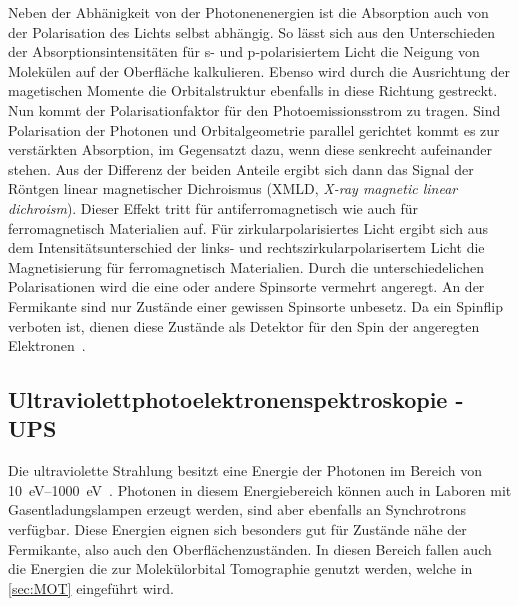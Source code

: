             Neben der Abhänigkeit von der Photonenenergien ist die Absorption auch von der Polarisation des Lichts selbst abhängig.
            So lässt sich aus den Unterschieden der Absorptionsintensitäten für s- und p-polarisiertem Licht die Neigung von Molekülen auf der Oberfläche kalkulieren\cite{floreano_periodic_2008}.
            Ebenso wird durch die Ausrichtung der magetischen Momente die Orbitalstruktur ebenfalls in diese Richtung gestreckt.
            Nun kommt der Polarisationfaktor für den Photoemissionsstrom zu tragen.
            Sind Polarisation der Photonen und Orbitalgeometrie parallel gerichtet kommt es zur verstärkten Absorption, im Gegensatzt dazu, wenn diese senkrecht aufeinander stehen.
            Aus der Differenz der beiden Anteile ergibt sich dann das Signal der Röntgen linear magnetischer Dichroismus (XMLD, \textit{X-ray magnetic linear dichroism}).
            Dieser Effekt tritt für antiferromagnetisch wie auch für ferromagnetisch Materialien auf.
            Für zirkularpolarisiertes Licht ergibt sich aus dem Intensitätsunterschied der links- und rechtszirkularpolarisertem Licht die Magnetisierung für ferromagnetisch Materialien.
            Durch die unterschiedelichen Polarisationen wird die eine oder andere Spinsorte vermehrt angeregt.
            An der Fermikante sind nur Zustände einer gewissen Spinsorte unbesetz.
            Da ein Spinflip verboten ist, dienen diese Zustände als Detektor für den Spin der angeregten Elektronen~\cite{stohr_magnetism_2006}.

        \subsection{Ultraviolettphotoelektronenspektroskopie - UPS} \label{sec:UPS}
            Die ultraviolette Strahlung besitzt eine Energie der Photonen im Bereich von \SIrange{10}{1000}{\electronvolt}~\cite{Fauster}.
            Photonen in diesem Energiebereich können auch in Laboren mit Gasentladungslampen erzeugt werden, sind aber ebenfalls an Synchrotrons verfügbar.
            Diese Energien eignen sich besonders gut für Zustände nähe der Fermikante, also auch den Oberflächenzuständen.
            In diesen Bereich fallen auch die Energien die zur Molekülorbital Tomographie genutzt werden, welche in \autoref{sec:MOT} eingeführt wird.

